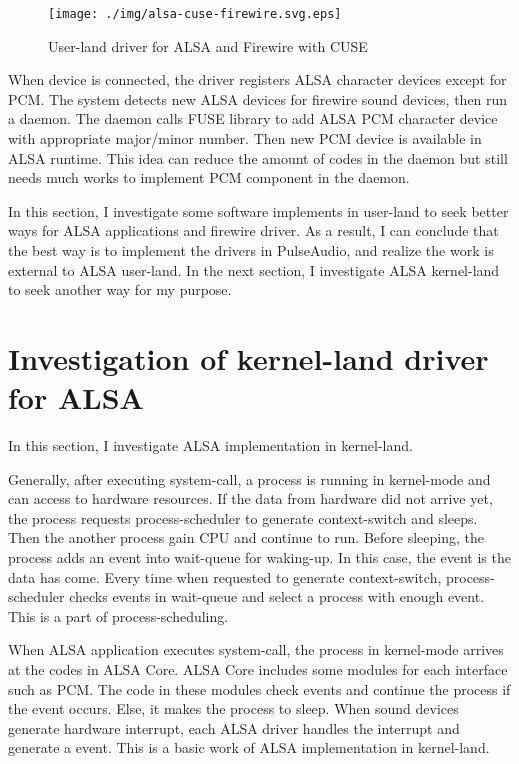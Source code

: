 \documentclass[onecolumn]{article}
\begin{document}
\begin{figure}[H]
	\centering
	\texttt{[image: ./img/alsa-cuse-firewire.svg.eps]}
	\caption{{User-land driver for ALSA and Firewire with CUSE}}
	\label{alsa_cuse_firewire}
\end{figure}

When device is connected, the driver registers ALSA character devices except for PCM. The system detects new ALSA devices for firewire sound devices, then run a daemon. The daemon calls FUSE library to add ALSA PCM character device with appropriate major/minor number. Then new PCM device is available in ALSA runtime. This idea can reduce the amount of codes in the daemon but still needs much works to implement PCM component in the daemon.

In this section, I investigate some software implements in user-land to seek better ways for ALSA applications and firewire driver. As a result, I can conclude that the best way is to implement the drivers in PulseAudio, and realize the work is external to ALSA user-land. In the next section, I investigate ALSA kernel-land to seek another way for my purpose.


\section{Investigation of kernel-land driver for ALSA}

In this section, I investigate ALSA implementation in kernel-land.

Generally, after executing system-call, a process is running in kernel-mode and can access to hardware resources. If the data from hardware did not arrive yet, the process requests process-scheduler to generate context-switch and sleeps. Then the another process gain CPU and continue to run. Before sleeping, the process adds an event into wait-queue for waking-up. In this case, the event is the data has come. Every time when requested to generate context-switch, process-scheduler checks events in wait-queue and select a process with enough event. This is a part of process-scheduling.

When ALSA application executes system-call, the process in kernel-mode arrives at the codes in ALSA Core. ALSA Core includes some modules for each interface such as PCM. The code in these modules check events and continue the process if the event occurs. Else, it makes the process to sleep. When sound devices generate hardware interrupt, each ALSA driver handles the interrupt and generate a event. This is a basic work of ALSA implementation in kernel-land.
\end{document}
